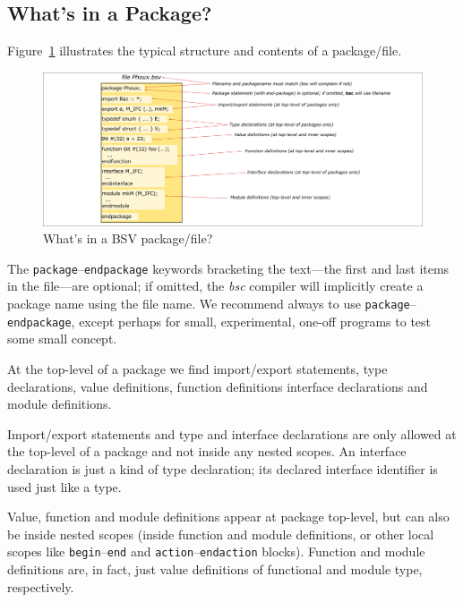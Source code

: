 
\subsection{What's in a Package?}

\label{Sec_package_contents}

Figure~\ref{Fig_BSV_Package} illustrates the typical
structure and contents of a package/file.
\begin{figure}[htbp]
  \centerline{\includegraphics[width=6in,angle=0]{Figures/Fig_BSV_Package}}
  \caption{\label{Fig_BSV_Package}
           What's in a BSV package/file?}
\end{figure}

The \verb|package|--\verb|endpackage| keywords bracketing the
text---the first and last items in the file---are optional; if
omitted, the \emph{bsc} compiler will implicitly create a package name
using the file name.  We recommend always to use
\verb|package|--\verb|endpackage|, except perhaps for small,
experimental, one-off programs to test some small concept.

At the top-level of a package we find import/export statements, type
declarations, value definitions, function definitions interface
declarations and module definitions.

Import/export statements and type and interface declarations are only
allowed at the top-level of a package and not inside any nested
scopes.  An interface declaration is just a kind of type declaration;
its declared interface identifier is used just like a type.

Value, function and module definitions appear at package top-level,
but can also be inside nested scopes (inside function and module
definitions, or other local scopes like \verb|begin|--\verb|end| and
\verb|action|--\verb|endaction| blocks).  Function and module
definitions are, in fact, just value definitions of functional and
module type, respectively.

